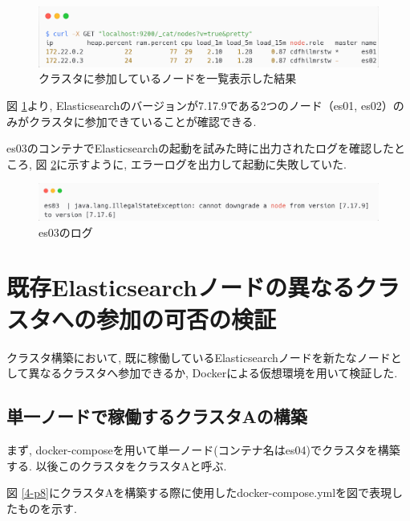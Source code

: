 \begin{figure}[H]
  \begin{center}
    \includegraphics[width=140mm]{sotu/figure/curl-different.png}
    \caption{クラスタに参加しているノードを一覧表示した結果}
    \label{4-p6}
  \end{center}
\end{figure}

図 \ref{4-p6}より, Elasticsearchのバージョンが7.17.9である2つのノード（es01, es02）のみがクラスタに参加できていることが確認できる.

es03のコンテナでElasticsearchの起動を試みた時に出力されたログを確認したところ, 図 \ref{4-p7}に示すように, エラーログを出力して起動に失敗していた.

\begin{figure}[H]
  \begin{center}
    \includegraphics[width=140mm]{sotu/figure/log.png}
    \caption{es03のログ}
    \label{4-p7}
  \end{center}
\end{figure}

\section{既存Elasticsearchノードの異なるクラスタへの参加の可否の検証}
クラスタ構築において, 既に稼働しているElasticsearchノードを新たなノードとして異なるクラスタへ参加できるか, Dockerによる仮想環境を用いて検証した.

\subsection{単一ノードで稼働するクラスタAの構築}

まず, docker-composeを用いて単一ノード(コンテナ名はes04)でクラスタを構築する. 以後このクラスタをクラスタAと呼ぶ.

図 \ref{4-p8}にクラスタAを構築する際に使用したdocker-compose.ymlを図で表現したものを示す.

